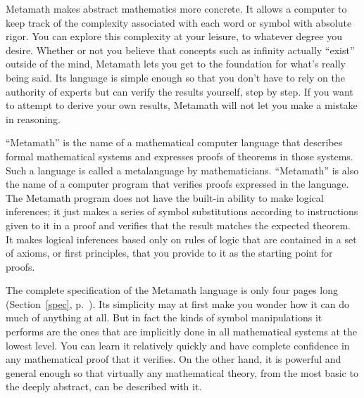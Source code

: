 Metamath makes abstract mathematics more concrete.  It allows
a computer to keep track of the complexity associated with each word or symbol
with absolute rigor.  You can explore this complexity at your leisure, to
whatever degree you desire.  Whether or not you believe that concepts such as
infinity actually ``exist'' outside of the mind, Metamath lets you get to the
foundation for what's really being said.  Its language is simple enough so that you
don't have to rely on the authority of experts but can verify the results
yourself, step by step.  If you want to attempt to derive your own results,
Metamath will not let you make a mistake in reasoning.

``Metamath'' is the name of a mathematical computer language
that describes formal mathematical
systems and expresses proofs of theorems in those systems.  Such a language
is called a metalanguage by mathematicians.  ``Metamath''
is also the name of a computer program that verifies
proofs expressed in the language.  The Metamath program does not have
the built-in
ability to make logical inferences; it just makes a series of symbol
substitutions according to instructions given to it in a proof
and verifies that the result matches the expected theorem.  It makes logical
inferences based only on rules of logic that are contained in a set of
axioms, or first principles, that you provide to it as the
starting point for proofs.

The complete specification of the Metamath language is only four pages long
(Section~\ref{spec}, p.~\pageref{spec}).  Its simplicity may at first make you
wonder how it can do much of anything at all.  But in fact the kinds of
symbol manipulations it performs are the ones that are implicitly done in all
mathematical systems at the lowest level.  You can learn it relatively quickly
and have complete confidence in any mathematical proof that it verifies.  On
the other hand, it is powerful and general enough so that virtually any
mathematical theory, from the most basic to the deeply abstract, can be
described with it.

